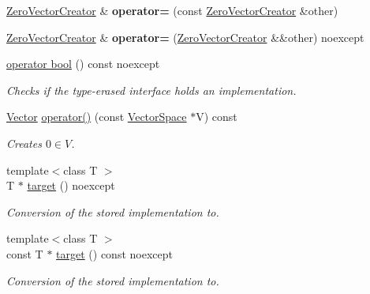 \begin{DoxyCompactItemize}
\item 
\hyperlink{classSpacy_1_1ZeroVectorCreator}{Zero\+Vector\+Creator} \& {\bfseries operator=} (const \hyperlink{classSpacy_1_1ZeroVectorCreator}{Zero\+Vector\+Creator} \&other)\hypertarget{classSpacy_1_1ZeroVectorCreator_ab2aed3130e7dd4eefbeb8b6f21346359}{}\label{classSpacy_1_1ZeroVectorCreator_ab2aed3130e7dd4eefbeb8b6f21346359}

\item 
\hyperlink{classSpacy_1_1ZeroVectorCreator}{Zero\+Vector\+Creator} \& {\bfseries operator=} (\hyperlink{classSpacy_1_1ZeroVectorCreator}{Zero\+Vector\+Creator} \&\&other) noexcept\hypertarget{classSpacy_1_1ZeroVectorCreator_a5924f0aa3af06b2c493540842a8f196b}{}\label{classSpacy_1_1ZeroVectorCreator_a5924f0aa3af06b2c493540842a8f196b}

\item 
\hyperlink{classSpacy_1_1ZeroVectorCreator_a2a716f5d88147abcdf73e834ec349c06}{operator bool} () const noexcept
\begin{DoxyCompactList}\small\item\em Checks if the type-\/erased interface holds an implementation. \end{DoxyCompactList}\item 
\hyperlink{classSpacy_1_1Vector}{Vector} \hyperlink{classSpacy_1_1ZeroVectorCreator_afb20329c56ee527505ef7390eba96870}{operator()} (const \hyperlink{classSpacy_1_1VectorSpace}{Vector\+Space} $\ast$V) const \hypertarget{classSpacy_1_1ZeroVectorCreator_afb20329c56ee527505ef7390eba96870}{}\label{classSpacy_1_1ZeroVectorCreator_afb20329c56ee527505ef7390eba96870}

\begin{DoxyCompactList}\small\item\em Creates $ 0 \in V $. \end{DoxyCompactList}\item 
{\footnotesize template$<$class T $>$ }\\T $\ast$ \hyperlink{classSpacy_1_1ZeroVectorCreator_ac6a6c8b0148da2ac7fc55fe1cc062321}{target} () noexcept
\begin{DoxyCompactList}\small\item\em Conversion of the stored implementation to. \end{DoxyCompactList}\item 
{\footnotesize template$<$class T $>$ }\\const T $\ast$ \hyperlink{classSpacy_1_1ZeroVectorCreator_a49fff06a4dc43f027eef5db923d3aad4}{target} () const noexcept
\begin{DoxyCompactList}\small\item\em Conversion of the stored implementation to. \end{DoxyCompactList}\end{DoxyCompactItemize}


